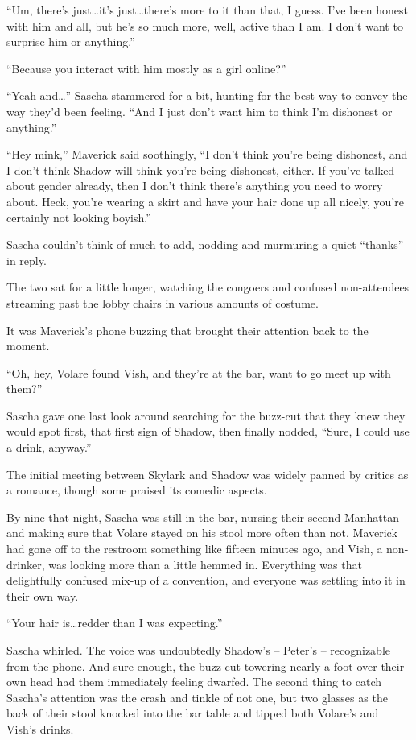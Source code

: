 ``Um, there's just\ldots{}it's just\ldots{}there's more to it than that, I guess. I've been honest with him and all, but he's so much more, well, active than I am. I don't want to surprise him or anything.''

``Because you interact with him mostly as a girl online?''

``Yeah and\ldots{}'' Sascha stammered for a bit, hunting for the best way to convey the way they'd been feeling. ``And I just don't want him to think I'm dishonest or anything.''

``Hey mink,'' Maverick said soothingly, ``I don't think you're being dishonest, and I don't think Shadow will think you're being dishonest, either. If you've talked about gender already, then I don't think there's anything you need to worry about. Heck, you're wearing a skirt and have your hair done up all nicely, you're certainly not looking boyish.''

Sascha couldn't think of much to add, nodding and murmuring a quiet ``thanks'' in reply.

The two sat for a little longer, watching the congoers and confused non-attendees streaming past the lobby chairs in various amounts of costume.

It was Maverick's phone buzzing that brought their attention back to the moment.

``Oh, hey, Volare found Vish, and they're at the bar, want to go meet up with them?''

Sascha gave one last look around searching for the buzz-cut that they knew they would spot first, that first sign of Shadow, then finally nodded, ``Sure, I could use a drink, anyway.''

\secdiv

The initial meeting between Skylark and Shadow was widely panned by critics as a romance, though some praised its comedic aspects.

By nine that night, Sascha was still in the bar, nursing their second Manhattan and making sure that Volare stayed on his stool more often than not. Maverick had gone off to the restroom something like fifteen minutes ago, and Vish, a non-drinker, was looking more than a little hemmed in. Everything was that delightfully confused mix-up of a convention, and everyone was settling into it in their own way.

``Your hair is\ldots{}redder than I was expecting.''

Sascha whirled. The voice was undoubtedly Shadow's -- Peter's -- recognizable from the phone.  And sure enough, the buzz-cut towering nearly a foot over their own head had them immediately feeling dwarfed. The second thing to catch Sascha's attention was the crash and tinkle of not one, but two glasses as the back of their stool knocked into the bar table and tipped both Volare's and Vish's drinks.


